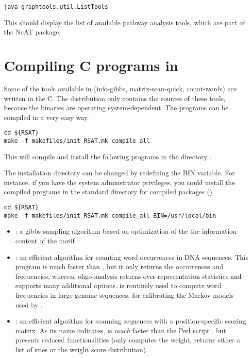 \documentclass[12pt,a4paper, oneside]{scrreprt} %
\begin{document}
\begin{lstlisting}
java graphtools.util.ListTools
\end{lstlisting}

This should display the list of available pathway analysis tools,
which are part of the NeAT package.


\section{Compiling C programs in \RSAT}

Some of the tools available in \RSAT (info-gibbs, matrix-scan-quick,
count-words) are written in the C. The distribution only contains
the sources of these tools, because the binaries are operating
system-dependent. The programs can be compiled in a very easy way.

\begin{lstlisting}
cd ${RSAT}
make -f makefiles/init_RSAT.mk compile_all
\end{lstlisting}

This will compile and install the following programs in the directory
. 

The installation directory can be changed by redefining the BIN
variable. For instance, if you have the system adminstrator
privileges, you could install the compiled programs in the standard
directory for compiled packages ().

\begin{lstlisting}
cd ${RSAT}
make -f makefiles/init_RSAT.mk compile_all BIN=/usr/local/bin
\end{lstlisting}


\begin{itemize}
\item {}: a gibbs sampling algorithm based on
  optimization of the the information content of the motif
  \cite{Defrance:2009}.

\item {}: an efficient algorithm for counting word
  occurrences in DNA sequences. This program is much faster than
  , but it only returns the occurrences and
  frequencies, whereas oligo-analysis returns over-representation
  statistics and supports many additional
  options.  is routinely used to compute word
  frequencies in large genome sequences, for calibrating the Markov
  models used by .

\item {}: an efficient algorithm for scanning
  sequences with a position-specific scoring matrix. As its name
  indicates,  is \emph{much} faster than
  the Perl script , but presents reduced
  functionalities (only computes the weight, returns either a list of
  sites or the weight score distribution).
\end{itemize}
\end{document}
